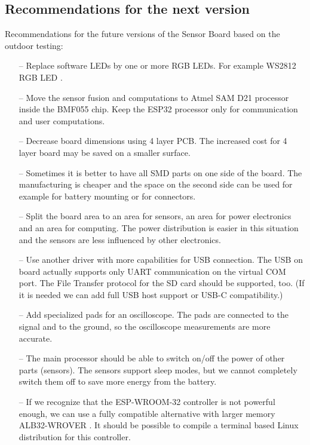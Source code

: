 \subsection{Recommendations for the next version}
\label{recommendationsNextVerison}
Recommendations for the future versions of the Sensor Board based on the outdoor testing:
\begin{itemize}
	\item[--] Replace software LEDs by one or more RGB LEDs. For example WS2812 RGB LED \cite{AdafruitLED}.
	\item[--] Move the sensor fusion and computations to Atmel SAM D21 \cite{AtmelSAM} processor inside the BMF055 \cite{BMF055} chip. Keep the ESP32 \cite{ESP32} processor only for communication and user computations.
	\item[--] Decrease board dimensions using 4 layer \ac{PCB}. The increased cost for 4 layer board may be saved on a smaller surface.
	\item[--] Sometimes it is better to have all \ac{SMD} parts on one side of the board. The manufacturing is cheaper and the space on the second side can be used for example for battery mounting or for connectors.
	\item[--] Split the board area to an area for sensors, an area for power electronics and an area for computing. The power distribution is easier in this situation and the sensors are less influenced by other electronics.
	\item[--] Use another driver with more capabilities for USB connection. The USB on board actually supports only UART communication on the virtual COM port. The File Transfer protocol for the SD card should be supported, too. (If it is needed we can add full USB host support or USB-C compatibility.)
	\item[--] Add specialized pads for an oscilloscope. The pads are connected to the signal and to the ground, so the oscilloscope measurements are more accurate.
	\item[--] The main processor should be able to switch on/off the power of other parts (sensors). The sensors support sleep modes, but we cannot completely switch them off to save more energy from the battery.
	\item[--] If we recognize that the ESP-WROOM-32 controller is not powerful enough, we can use a fully compatible alternative with larger memory ALB32-WROVER \cite{ALB32-WROVER}. It should be possible to compile a terminal based Linux distribution for this controller.
\end{itemize}

